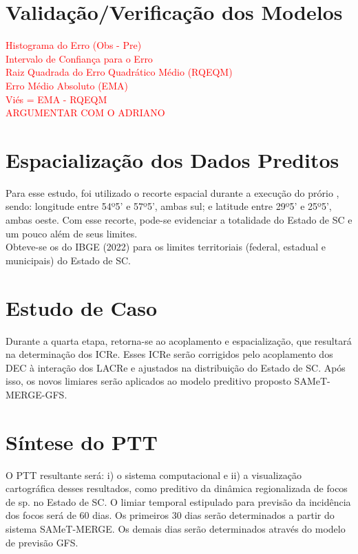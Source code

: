\section{Validação/Verificação dos Modelos}

\indet \textcolor{red}{Histograma do Erro (Obs - Pre)\\
\indent Intervalo de Confiança para o Erro\\
\indent Raiz Quadrada do Erro Quadrático Médio (RQEQM)\\
\indent Erro Médio Absoluto (EMA)\\
\indent Viés = EMA - RQEQM}\\

\indent \textcolor{red}{ARGUMENTAR COM O ADRIANO}\\

\section{Espacialização dos Dados Preditos}

\indent Para esse estudo, foi utilizado o recorte espacial durante a execução do prório , sendo: longitude entre 54º5' e 57º5', ambas sul; e latitude entre 29º5' e 25º5', ambas oeste. Com esse recorte, pode-se evidenciar a totalidade do Estado de \acrlong{SC} e um pouco além de seus limites.\\
\indent Obteve-se os  do \acrshort{IBGE} (2022) para os limites territoriais (federal, estadual e municipais) do Estado de \acrlong{SC}.\\

\section{Estudo de Caso}

\indent Durante a quarta etapa, retorna-se ao acoplamento e espacialização, que resultará na determinação dos \acrfull{ICRe}. Esses \acrshort{ICRe} serão corrigidos pelo acoplamento dos \acrshort{DEC} à interação dos \acrshort{LACRe} e ajustados na distribuição do Estado de \acrlong{SC}. Após isso, os novos limiares serão aplicados ao modelo preditivo proposto \acrshort{SAMeT}-\acrshort{MERGE}-\acrshort{GFS}.


\section{Síntese do \acrfull{PTT}} 

\indent O \acrshort{PTT} resultante será: i) o sistema computacional e ii) a visualização cartográfica desses resultados, como preditivo da dinâmica regionalizada de focos de  sp. no Estado de \acrlong{SC}. O limiar temporal estipulado para previsão da incidência dos focos será de 60 dias. Os primeiros 30 dias serão determinados a partir do sistema \acrshort{SAMeT}-\acrshort{MERGE}. Os demais dias serão determinados através do modelo de previsão \acrshort{GFS}.


